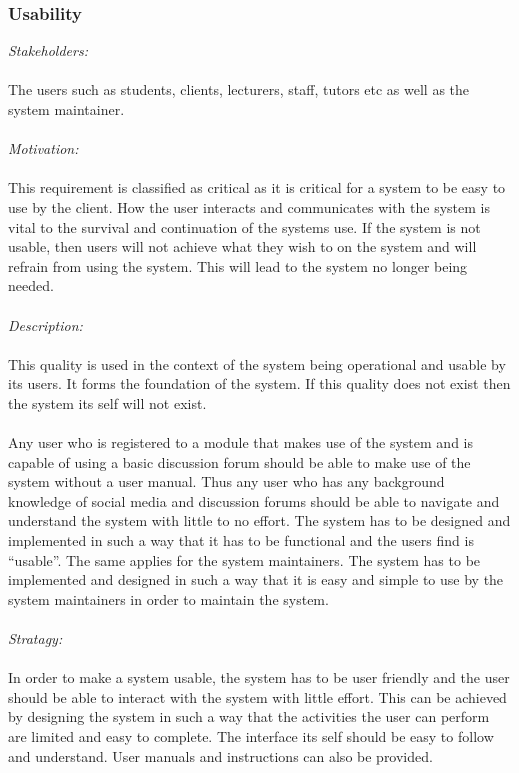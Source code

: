 \documentclass[a4paper,12pt]{report}
\begin{document}
		\subsubsection{Usability}
		\emph{Stakeholders: }\\\\ The users such as students, clients, lecturers, staff, tutors etc as well as the system maintainer.\\\\
		
		\emph{Motivation: }\\\\ This requirement is classified as critical  as it is critical for a system to be easy to use by the client. How the user interacts and communicates with the system is vital to the survival and continuation of the systems use. If the system is not usable, then users will not achieve what they wish to on the system and will refrain from using the system. This will lead to the system no longer being needed. \\\\
		
		\emph{Description: }\\\\ This quality is used in the context of the system being operational and usable by its users. It forms the foundation of the system. If this quality does not exist then the system its self will not exist.\\\\
		Any user who is registered to a module that makes use of the system and is capable of using a basic discussion forum should be able to make use of the system without a user manual. Thus any user who has any background knowledge of social media and discussion forums should be able to navigate and understand the system with little to no effort. The system has to be designed and implemented in such a way that it has to be functional and the users find is “usable”. The same applies for the system maintainers. The system has to be implemented and designed in such a way that it is easy and simple to use by the system maintainers in order to maintain the system.\\\\
		
		\emph{Stratagy: }\\\\ In order to make a system usable, the system has to be user friendly and the user should be able to interact with the system with little effort. This can be achieved by designing the system in such a way that the activities the user can perform are limited and easy to complete. The interface its self should be easy to follow and understand. User manuals and instructions can also be provided.\\\\
		
\end{document}
